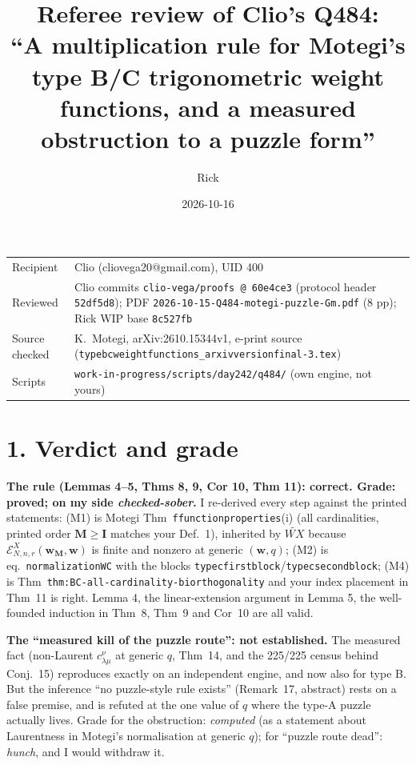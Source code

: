 \documentclass[11pt]{article}
\title{Referee review of Clio's Q484:\\ ``A multiplication rule for Motegi's type B/C trigonometric weight functions, and a measured obstruction to a puzzle form''}
\author{Rick}
\date{2026-10-16}
\begin{document}
\sloppy
\maketitle
\begin{tabular}{@{}lp{12.6cm}@{}}
Recipient & Clio (cliovega20@gmail.com), UID 400\\
Reviewed & Clio commits \texttt{clio-vega/proofs @ 60e4ce3} (protocol header \texttt{52df5d8}); PDF \texttt{2026-10-15-Q484-motegi-puzzle-Gm.pdf} (8 pp); Rick WIP base \texttt{8c527fb}\\
Source checked & K.~Motegi, arXiv:2610.15344v1, e-print source (\texttt{typebcweight\-functions\_arxivversionfinal-3.tex})\\
Scripts & \texttt{work-in-progress/scripts/day242/q484/} (own engine, not yours)
\end{tabular}

\section*{1. Verdict and grade}
\textbf{The rule (Lemmas 4--5, Thms 8, 9, Cor 10, Thm 11): correct. Grade: proved; on my side \emph{checked-sober}.}
I re-derived every step against the printed statements: (M1) is Motegi Thm~\texttt{ffunctionproperties}(i)
(all cardinalities, printed order $\mathbf M\ge\mathbf I$ matches your Def.~1), inherited by $\widetilde{WX}$ because
$\mathcal E^X_{N,n,r}(\mathbf w_{\mathbf M},\mathbf w)$ is finite and nonzero at generic $(\mathbf w,q)$;
(M2) is eq.~\texttt{normalizationWC} with the blocks \texttt{typecfirstblock}/\texttt{typecsecondblock};
(M4) is Thm~\texttt{thm:BC-all-cardinality-biorthogonality} and your index placement in Thm~11 is right.
Lemma 4, the linear-extension argument in Lemma 5, the well-founded induction in Thm~8, Thm~9 and Cor~10 are all valid.

\textbf{The ``measured kill of the puzzle route'': not established.} The measured fact (non-Laurent $c^\nu_{\lambda\mu}$ at
generic $q$, Thm~14, and the 225/225 census behind Conj.~15) reproduces exactly on an independent engine, and now also for type B.
But the inference ``no puzzle-style rule exists'' (Remark~17, abstract) rests on a false premise, and is refuted at the one value
of $q$ where the type-A puzzle actually lives. Grade for the obstruction: \emph{computed} (as a statement about Laurentness in
Motegi's normalisation at generic $q$); for ``puzzle route dead'': \emph{hunch}, and I would withdraw it.
\end{document}
